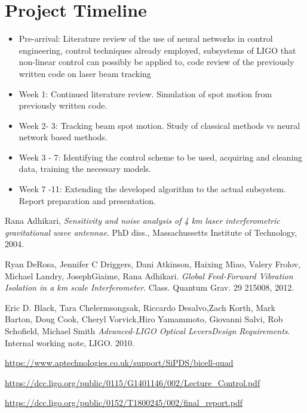 \documentclass[colorlinks=true,pdfstartview=FitV,linkcolor=blue,
            citecolor=red,urlcolor=magenta]{ligodoc}
\begin{document}
\section{Project Timeline}
\begin{itemize}
    \item Pre-arrival: Literature review of the use of neural networks in control engineering, control techniques already employed, subsystems of LIGO that non-linear control can possibly be applied to, code review of the previously written code on laser beam tracking
    \item Week 1: Continued literature review. Simulation of spot motion from previously written code.
    \item Week 2- 3: Tracking beam spot motion. Study of classical methods vs neural network based methods.
    \item Week 3 - 7: Identifying the control scheme to be used, acquiring and cleaning data, training the necessary models.
    \item Week 7 -11: Extending the developed algorithm to the actual subsystem. Report preparation and presentation.
\end{itemize}



\begin{thebibliography}{9}


    Rana Adhikari,
    \emph{Sensitivity and noise analysis of 4 km laser interferometric gravitational wave antennae}.
    PhD diss., Massachussetts Institute of Technology, 2004.

    Ryan DeRosa, Jennifer C Driggers, Dani Atkinson, Haixing Miao, Valery Frolov, Michael Landry, JosephGiaime, Rana Adhikari. 
    \emph{Global Feed-Forward Vibration Isolation in a km scale Interferometer}.
    Class. Quantum Grav. 29 215008, 2012.

    Eric D. Black, Tara Chelermsongsak, Riccardo Desalvo,Zach Korth, Mark Barton, Doug Cook, 
    Cheryl Vorvick,Hiro Yamammoto, Giovanni Salvi, Rob Schofield, Michael Smith
    \emph{Advanced-LIGO Optical LeversDesign Requirements}.
    Internal working note, LIGO. 2010.
      

      \url{https://www.aptechnologies.co.uk/support/SiPDS/bicell-quad}

      \url{https://dcc.ligo.org/public/0115/G1401146/002/Lecture_Control.pdf}

      \url{https://dcc.ligo.org/public/0152/T1800245/002/final_report.pdf}


      
 
\end{thebibliography} %
\end{document}
